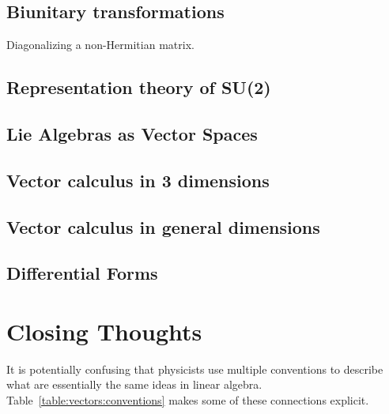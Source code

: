 \documentclass[12pt, oneside]{report}    %
\let\oldsection\section
\def\section{%
  \setcounter{sidenote}{1}%
  \oldsection
}
\begin{document}
\section{Biunitary transformations}
Diagonalizing a non-Hermitian matrix.


\section{Representation theory of SU(2)}
\section{Lie Algebras as Vector Spaces}
\section{Vector calculus in 3 dimensions}
\section{Vector calculus in general dimensions}
\section{Differential Forms}


\chapter*{Closing Thoughts}


It is potentially confusing that physicists use multiple conventions to describe what are essentially the same ideas in linear algebra. Table~\ref{table:vectors:conventions} makes some of these connections explicit.
\end{document}
